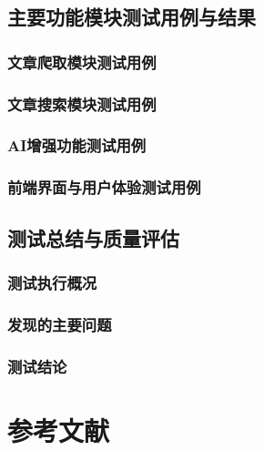\documentclass[a4paper,12pt]{ctexart}
\begin{document}
\subsection{主要功能模块测试用例与结果}

\subsubsection{文章爬取模块测试用例}

\subsubsection{文章搜索模块测试用例}

\subsubsection{AI增强功能测试用例}

\subsubsection{前端界面与用户体验测试用例}

\subsection{测试总结与质量评估}

\subsubsection{测试执行概况}

\subsubsection{发现的主要问题}

\subsubsection{测试结论}

\section{参考文献}
\end{document}
